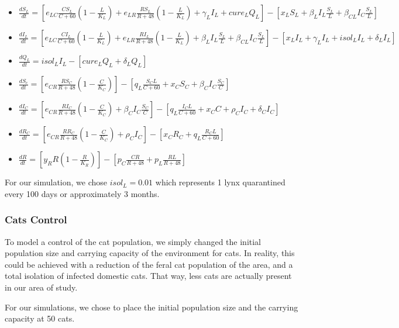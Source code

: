 \documentclass[12pt]{article}
\begin{document}
\begin{itemize}
	\item $\frac{dS_{L}}{dt} = [e_{LC}\frac{CS_{L}}{C + 60}(1 - \frac{L}{K_{L}}) + e_{LR}\frac{RS_{L}}{R + 48}(1 - \frac{L}{K_{L}}) + \gamma_{L}I_{L} + cure_{L}Q_{L}] - [x_{L}S_{L} + \beta_{L}I_{L}\frac{S_{L}}{L} + \beta_{CL}I_{C}\frac{S_{L}}{L}]$
	\item $\frac{dI_{L}}{dt} = [e_{LC}\frac{CI_{L}}{C + 60}(1 - \frac{L}{K_{L}}) + e_{LR}\frac{RI_{L}}{R + 48}(1 - \frac{L}{K_{L}}) + \beta_{L}I_{L}\frac{S_{L}}{L} + \beta_{CL}I_{C}\frac{S_{L}}{L}] - [x_{L}I_{L} + \gamma_{L}I_{L} + isol_{L}I_{L} + \delta_{L}I_{L}]$
	\item $\frac{dQ_{L}}{dt} = isol_{L}I_{L} - [cure_{L}Q_{L} + \delta_{L}Q_{L}]$
	\item $\frac{dS_{c}}{dt} = [e_{CR}\frac{RS_{C}}{R + 48}(1 - \frac{C}{K_{C}})] - [q_{L}\frac{S_{C}L}{C + 60} + x_{C}S_{C} + \beta_{C}I_{C}\frac{S_{C}}{C}]$
	\item $\frac{dI_{C}}{dt} = [e_{CR}\frac{RI_{C}}{R + 48}(1 - \frac{C}{K_{C}})  + \beta_{C}I_{C}\frac{S_{C}}{C}] - [q_{L}\frac{I_{C}L}{C + 60} + x_{C}C + \rho_{C}I_{C} + \delta_{C}I_{C}] $
	\item $\frac{dR_{C}}{dt} = [e_{CR}\frac{RR_{C}}{R + 48}(1 - \frac{C}{K_{C}}) + \rho_{C}I_{C}] - [x_{C}R_{C} + q_{L}\frac{R_{C}L}{C + 60}]$
	\item $\frac{dR}{dt} = [y_{R}R(1 - \frac{R}{K_{R}})] - [p_{C}\frac{CR}{R + 48} + p_{L}\frac{RL}{R + 48}]$
\end{itemize}
\quad For our simulation, we chose $isol_{L} = 0.01$ which represents 1 lynx quarantined every 100 days or approximately 3 months. 

\subsubsection{Cats Control}
\quad To model a control of the cat population, we simply changed the initial population size and carrying capacity of the environment for cats. In reality, this could be achieved with a reduction of the feral cat population of the area, and a total isolation of infected domestic cats. That way, less cats are actually present in our area of study.

\quad For our simulations, we chose to place the initial population size and the carrying capacity at 50 cats. 
\end{document}
